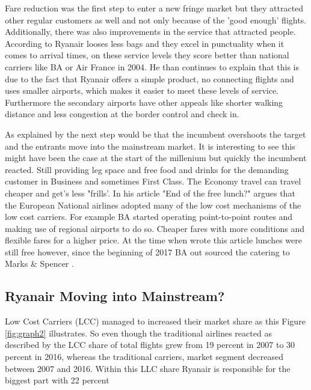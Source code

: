 \documentclass[a4paper, 11pt]{article}
\begin{document}
Fare reduction was the first step to enter a new fringe market but they attracted other regular customers as well and not only because of the 'good enough' flights. Additionally, there was also improvements in the service that attracted people. According to \cite{Barrett} Ryanair looses less bags and they excel in punctuality when it comes to arrival times, on these service levels they score better than national carriers like BA or Air France in 2004. He \citep{Barrett} than continues to explain that this is due to the fact that Ryanair offers a simple product, no connecting flights and uses smaller airports, which makes it easier to meet these levels of service. Furthermore the secondary airports have other appeals like shorter walking distance and less congestion at the border control and check in.

As explained by \cite{Christensen2015} the next step would be that the incumbent overshoots the target and the entrants move into
the mainstream market. It is interesting to see this might have been the case at the start of the millenium but quickly the
incumbent reacted. Still providing leg space and free food and drinks for the demanding customer in Business and sometimes
First Class. The Economy travel can travel cheaper and get's less "frills'. In his article "End of the free lunch?"
\cite{Dennis} argues that the European National airlines adopted many of the low cost mechanisms of the low cost carriers. For
example BA started operating point-to-point routes and making use of regional airports to do so. Cheaper fares with more
conditions and flexible fares for a higher price. At the time when \cite{Dennis} wrote this article lunches were still free
however, since the beginning of 2017 BA out sourced the catering to Marks \& Spencer \citep{Calder}.


\subsection{Ryanair Moving into Mainstream?}
\label{limits}


Low Cost Carriers (LCC) managed to increased their market share as this Figure \ref{fig:graph2} illustrates. So even though the traditional airlines reacted as described by \citep{Dennis} the LCC share of total flights grew from 19 percent in 2007 to 30 percent in 2016, whereas the traditional carriers, market segment decreased between 2007 and 2016. Within this LLC share Ryanair is responsible for the biggest part with 22 percent \citep{Eurocontrol2017}
\end{document}
